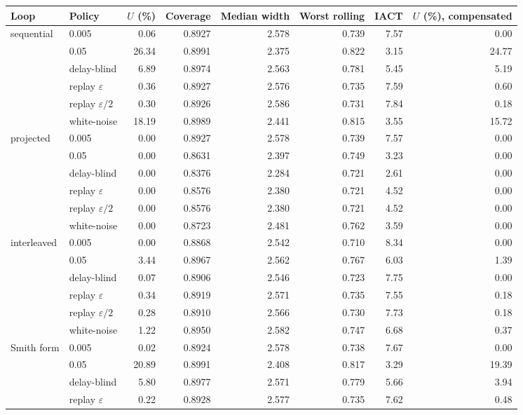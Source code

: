 \begin{tabular}{@{}llrrrrrr@{}}
\toprule
Loop & Policy & $U$ (\%) & Coverage & Median width & Worst rolling & IACT & $U$ (\%), compensated \\
\midrule
sequential & 0.005 & 0.06 & 0.8927 & 2.578 & 0.739 & 7.57 & 0.00 \\
 & 0.05 & 26.34 & 0.8991 & 2.375 & 0.822 & 3.15 & 24.77 \\
 & delay-blind & 6.89 & 0.8974 & 2.563 & 0.781 & 5.45 & 5.19 \\
 & replay $\varepsilon$ & 0.36 & 0.8927 & 2.576 & 0.735 & 7.59 & 0.60 \\
 & replay $\varepsilon/2$ & 0.30 & 0.8926 & 2.586 & 0.731 & 7.84 & 0.18 \\
 & white-noise & 18.19 & 0.8989 & 2.441 & 0.815 & 3.55 & 15.72 \\
\addlinespace
projected & 0.005 & 0.00 & 0.8927 & 2.578 & 0.739 & 7.57 & 0.00 \\
 & 0.05 & 0.00 & 0.8631 & 2.397 & 0.749 & 3.23 & 0.00 \\
 & delay-blind & 0.00 & 0.8376 & 2.284 & 0.721 & 2.61 & 0.00 \\
 & replay $\varepsilon$ & 0.00 & 0.8576 & 2.380 & 0.721 & 4.52 & 0.00 \\
 & replay $\varepsilon/2$ & 0.00 & 0.8576 & 2.380 & 0.721 & 4.52 & 0.00 \\
 & white-noise & 0.00 & 0.8723 & 2.481 & 0.762 & 3.59 & 0.00 \\
\addlinespace
interleaved & 0.005 & 0.00 & 0.8868 & 2.542 & 0.710 & 8.34 & 0.00 \\
 & 0.05 & 3.44 & 0.8967 & 2.562 & 0.767 & 6.03 & 1.39 \\
 & delay-blind & 0.07 & 0.8906 & 2.546 & 0.723 & 7.75 & 0.00 \\
 & replay $\varepsilon$ & 0.34 & 0.8919 & 2.571 & 0.735 & 7.55 & 0.18 \\
 & replay $\varepsilon/2$ & 0.28 & 0.8910 & 2.566 & 0.730 & 7.73 & 0.18 \\
 & white-noise & 1.22 & 0.8950 & 2.582 & 0.747 & 6.68 & 0.37 \\
\addlinespace
Smith form & 0.005 & 0.02 & 0.8924 & 2.578 & 0.738 & 7.67 & 0.00 \\
 & 0.05 & 20.89 & 0.8991 & 2.408 & 0.817 & 3.29 & 19.39 \\
 & delay-blind & 5.80 & 0.8977 & 2.571 & 0.779 & 5.66 & 3.94 \\
 & replay $\varepsilon$ & 0.22 & 0.8928 & 2.577 & 0.735 & 7.62 & 0.48 \\

\end{tabular}
